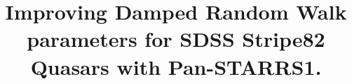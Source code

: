 \documentclass[twocolumn]{aastex62}
\begin{document}
\title{Improving Damped Random Walk parameters for SDSS Stripe82 Quasars with Pan-STARRS1. }



\end{document}
